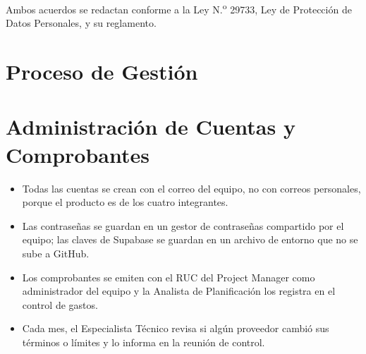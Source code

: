 \documentclass[11pt,a4paper]{article}
\begin{document}
\vspace{0.1cm}
\noindent Ambos acuerdos se redactan conforme a la Ley N.\textsuperscript{o} 29733, Ley de Protección de Datos Personales, y su reglamento.

\section{Proceso de Gestión}
\begin{center}
\end{center}

\section{Administración de Cuentas y Comprobantes}
\begin{itemize}[leftmargin=*]
    \item Todas las cuentas se crean con el correo del equipo, no con correos personales, porque el producto es de los cuatro integrantes.
    \item Las contraseñas se guardan en un gestor de contraseñas compartido por el equipo; las claves de Supabase se guardan en un archivo de entorno que no se sube a GitHub.
    \item Los comprobantes se emiten con el RUC del Project Manager como administrador del equipo y la Analista de Planificación los registra en el control de gastos.
    \item Cada mes, el Especialista Técnico revisa si algún proveedor cambió sus términos o límites y lo informa en la reunión de control.
\end{itemize}
\end{document}

